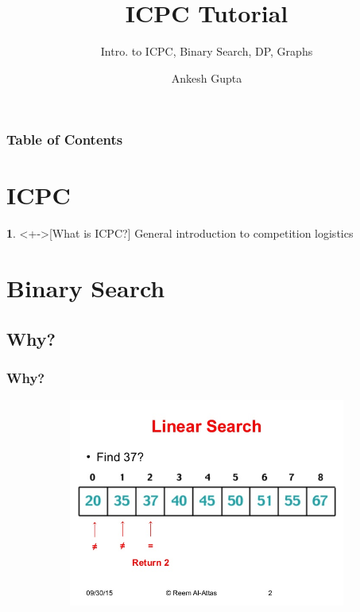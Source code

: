 \documentclass[mathserif,notheorems]{beamer} %
\title[ICPC Tutorial]{ICPC Tutorial}
\subtitle{Intro. to ICPC, Binary Search, DP, Graphs}
\author[Ankesh] %
{
	Ankesh Gupta
}
\institute[IIT D] %
{
  Dept. of Computer Science and Engineering\\
  Indian Institute of Technology, Delhi
}
\date[\today] %
{}
\theoremstyle{plain} %
\theoremstyle{definition} %
\newtheorem*{definition}{}%
\begin{document}
 
\frame{\titlepage}
\begin{frame}
\frametitle{Table of Contents}
\tableofcontents
\end{frame}

\section{ICPC}
\begin{frame}
\begin{definition}<+->[What is ICPC?]
General introduction to competition logistics
\end{definition}
\end{frame}

\section{Binary Search}
\subsection{Why?}
\begin{frame}
\frametitle{Why?}
\begin{figure}[!htb]
	\begin{subfigure}{\textwidth}
		\centering
		\includegraphics[width=1\textwidth]{ls.jpg}
	\end{subfigure}
\end{figure}

\end{frame}

\end{document}
